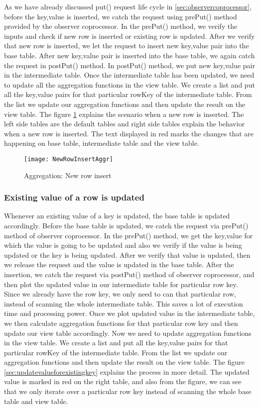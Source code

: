 \documentclass[11pt,a4paper,bibtotoc,idxtotoc,headsepline,footsepline,footexclude,BCOR12mm,DIV13]{scrbook}
\begin{document}
As we have already discussed put() request life cycle in \ref{sec:observercoprocessor}, before the key,value is inserted, we catch the request using prePut() method provided by the observer coprocessor. In the prePut() method, we verify the inputs and check if new row is inserted or existing row is updated. After we verify that new row is inserted, we let the request to insert new key,value pair into the base table. After new key,value pair is inserted into the base table, we again catch the request in postPut() method. In postPut() method, we put new key,value pair in the intermediate table. Once the intermediate table has been updated, we need to update all the aggregation functions in the view table. We create a list and put all the key,value pairs for that particular rowKey of the intermediate table. From the list we update our aggregation functions and then update the result on the view table. The figure \ref{sec:newrowinsertagggregation} explains the scenario when a new row is inserted. The left side tables are the default tables and right side tables explain the behavior when a new row is inserted. The text displayed in red marks the changes that are happening on base table, intermediate table and  the view table. 
\begin{figure}
    \centering
    \texttt{[image: NewRowInsertAggr]}
    \caption{Aggregation: New row insert}
    \label{sec:newrowinsertagggregation}
    
\end{figure}

\newpage
\subsubsection{Existing value of a row is updated}
Whenever an existing value of a key is updated, the base table is updated accordingly. Before the base table is updated, we catch the request via prePut() method of observer coprocessor. In the prePut() method, we get the key,value for which the value is going to be updated and also we verify if the value is being updated or the key is being updated. After we verify that value is updated, then we release the request and the value is updated in the base table. After the insertion, we catch the request via postPut() method of observer coprocessor, and then plot the updated value in our intermediate table for particular row key. Since we already have the row key, we only need to can that particular row, instead of scanning the whole intermediate table. This saves a lot of execution time and processing power. Once we plot updated value in the intermediate table, we then calculate aggregation functions for that particular row key and then update our view table accordingly. Now we need to update aggregation functions in the view table. We create a list and put all the key,value pairs for that particular rowKey of the intermediate table. From the list we update our aggregation functions and then update the result on the view table. The figure \ref{sec:updatevalueforexistingkey} explains the process in more detail. The updated value is marked in red on the right table, and also from the figure, we can see that we only iterate over a particular row key instead of scanning the whole base table and view table.
\end{document}
